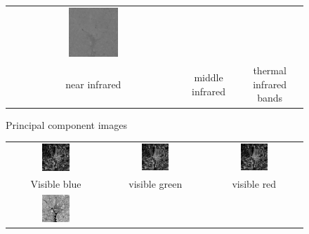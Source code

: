 \documentclass[11pt,a4paper]{article}
\begin{document}
\begin{figure}[!htbp]
\begin{tabular}{ccc}
		\includegraphics[width=0.3\textwidth]{pro10/PC/11_40_f}\\
		near infrared & middle infrared& thermal infrared bands
	\end{tabular}
	\caption{Principal component images}
	\label{pro10_fig3}
\end{figure}

\begin{figure}[!htbp]
	\centering
	\begin{tabular}{ccc} 
		\includegraphics[width=0.3\textwidth]{pro10/PC/11_41_a}&
		\includegraphics[width=0.3\textwidth]{pro10/PC/11_41_b}&
		\includegraphics[width=0.3\textwidth]{pro10/PC/11_41_c}\\
		 Visible blue & visible green  & visible red\\
		\includegraphics[width=0.3\textwidth]{pro10/PC/11_41_d}&

\end{tabular}
\end{figure}
\end{document}

